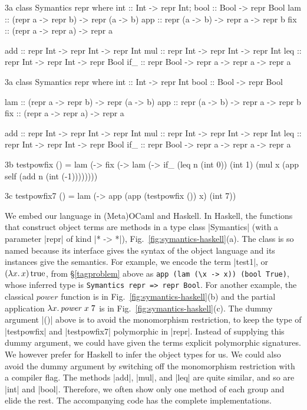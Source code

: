 \ifshort
\begin{SaveVerbatim}{3a}
class Symantics repr where
  int :: Int  -> repr Int;       bool :: Bool -> repr Bool
  lam :: (repr a -> repr b) -> repr (a -> b)
  app :: repr (a -> b) -> repr a -> repr b
  fix :: (repr a -> repr a) -> repr a

  add :: repr Int -> repr Int -> repr Int
  mul :: repr Int -> repr Int -> repr Int
  leq :: repr Int -> repr Int -> repr Bool
  if_ :: repr Bool -> repr a -> repr a -> repr a
\end{SaveVerbatim}
\else
\begin{SaveVerbatim}{3a}
class Symantics repr where
  int  :: Int  -> repr Int
  bool :: Bool -> repr Bool

  lam :: (repr a -> repr b) -> repr (a -> b)
  app :: repr (a -> b) -> repr a -> repr b
  fix :: (repr a -> repr a) -> repr a

  add :: repr Int -> repr Int -> repr Int
  mul :: repr Int -> repr Int -> repr Int
  leq :: repr Int -> repr Int -> repr Bool
  if_ :: repr Bool -> repr a -> repr a -> repr a
\end{SaveVerbatim}
\fi
\begin{SaveVerbatim}{3b}
testpowfix () = lam (\x -> fix (\self -> lam (\n ->
                 if_ (leq n (int 0)) (int 1)
                     (mul x (app self (add n (int (-1))))))))
\end{SaveVerbatim}
\begin{SaveVerbatim}{3c}
testpowfix7 () = lam (\x -> app (app (testpowfix ()) x) (int 7))
\end{SaveVerbatim}

We embed our language in (Meta)OCaml and Haskell.  In Haskell,
the functions that construct object terms are methods in a type class
|Symantics| (with a parameter |repr| of kind |* -> *|)\ifshort,
Fig.~\ref{fig:symantics-haskell}(a)\fi. The class is so named
because its interface gives the syntax of the object language and its
instances give the semantics.
\ifshort\else{}\fi
For example, we encode the term |test1|, or $(\mathopen{\lambda\mathord{x}.\,}x)\mathinner{\mathrm{true}}$, from
\S\ref{tagproblem} above as \texttt{app (lam (\textbackslash x -> x)) (bool True)},
whose inferred type is \texttt{Symantics repr => repr Bool}.
For another example, the classical $\mathit{power}$ function is
\ifshort in Fig.~\ref{fig:symantics-haskell}(b)
\else{}\fi
and the partial application $\mathopen{\lambda\mathord{x}.\,} \mathit{power}\;x\;7$ is
\ifshort in Fig.~\ref{fig:symantics-haskell}(c).
\else{}\fi
The dummy argument |()| above is to avoid the monomorphism
restriction, to keep the type of |testpowfix| and |testpowfix7|
polymorphic in |repr|. Instead of supplying this dummy
argument, we could have given the terms explicit polymorphic
signatures.  We however prefer for
Haskell to infer the object types for us. We could also
avoid the dummy argument by switching off the monomorphism restriction
with a compiler flag.
The methods |add|, |mul|, and |leq| are quite similar, and so are
|int| and |bool|. Therefore, we often show
only one method of each group and elide the rest. The
accompanying code has the complete implementations.

